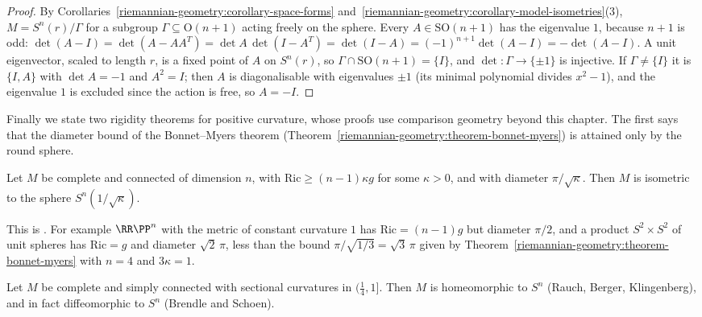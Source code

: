 \begin{proof}
By Corollaries~\ref{riemannian-geometry:corollary-space-forms} and~\ref{riemannian-geometry:corollary-model-isometries}(3), $M = S^n(r)/\Gamma$ for a subgroup
$\Gamma \subseteq \mathrm{O}(n + 1)$ acting freely on the sphere. Every $A \in \mathrm{SO}(n + 1)$ has the eigenvalue $1$, because $n + 1$ is odd:
$\det(A - I) = \det(A - AA^T) = \det A\,\det(I - A^T) = \det(I - A) = (-1)^{n+1}\det(A - I) = -\det(A - I)$. A unit eigenvector, scaled to length $r$, is a fixed point of
$A$ on $S^n(r)$, so $\Gamma \cap \mathrm{SO}(n + 1) = \{I\}$, and $\det \colon \Gamma \to \{\pm1\}$ is injective. If $\Gamma \neq \{I\}$ it is $\{I, A\}$ with
$\det A = -1$ and $A^2 = I$; then $A$ is diagonalisable with eigenvalues $\pm1$ (its minimal polynomial divides $x^2 - 1$), and the eigenvalue $1$ is excluded since the
action is free, so $A = -I$.
\end{proof}

Finally we state two rigidity theorems for positive curvature, whose proofs use comparison geometry beyond this chapter. The first says that the diameter bound of
the Bonnet--Myers theorem (Theorem~\ref{riemannian-geometry:theorem-bonnet-myers}) is attained only by the round sphere.

\begin{theorem}\label{riemannian-geometry:theorem-maximal-diameter}
Let $M$ be complete and connected of dimension $n$, with $\mathrm{Ric} \geq (n - 1)\kappa g$ for some $\kappa > 0$, and with diameter $\pi/\sqrt\kappa$. Then $M$ is
isometric to the sphere $S^n(1/\sqrt\kappa)$.
\end{theorem}

This is \cite{cheng-1975}. For example $\RR\PP^n$ with the metric of constant curvature $1$ has $\mathrm{Ric} = (n - 1)g$ but diameter $\pi/2$, and a product
$S^2 \times S^2$ of unit spheres has $\mathrm{Ric} = g$ and diameter $\sqrt2\,\pi$, less than the bound $\pi/\sqrt{1/3} = \sqrt3\,\pi$ given by
Theorem~\ref{riemannian-geometry:theorem-bonnet-myers} with $n = 4$ and $3\kappa = 1$.

\begin{theorem}\label{riemannian-geometry:theorem-sphere}
Let $M$ be complete and simply connected with sectional curvatures in $(\frac14, 1]$. Then $M$ is homeomorphic to $S^n$ (Rauch, Berger, Klingenberg), and in fact
diffeomorphic to $S^n$ (Brendle and Schoen).
\end{theorem}

